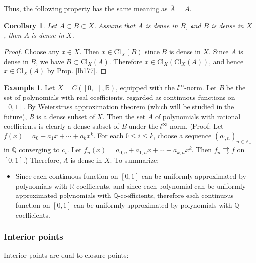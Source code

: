 \documentclass[12pt,b5paper,notitlepage]{article}
\theoremstyle{definition}
\newtheorem{eg}[df]{Example}
\theoremstyle{plain}
\newtheorem{co}[df]{Corollary}
\newcommand{\ovl}{\overline}
\newcommand{\Zbb}{\mathbb Z}
\newcommand{\Qbb}{\mathbb Q}
\newcommand{\Rbb}{\mathbb R}
\newcommand{\Cl}{\mathrm{Cl}}
\numberwithin{equation}{section}
\begin{document}
Thus, the following property has the same meaning as $\ovl{\ovl A}=A$.
\begin{co}
Let $A\subset B\subset X$. Assume that $A$ is dense in $B$, and $B$ is dense in $X$, then $A$ is dense in $X$.
\end{co}
\begin{proof}
Choose any $x\in X$. Then $x\in\Cl_X(B)$ since $B$ is dense in $X$. Since $A$ is dense in $B$, we have $B\subset \Cl_X(A)$. Therefore $x\in\Cl_X(\Cl_X(A))$, and hence $x\in\Cl_X(A)$ by Prop. \ref{lb177}.
\end{proof}

\begin{eg}
Let $X=C([0,1],\Rbb)$, equipped with the $l^\infty$-norm. Let $B$ be the set of polynomials with real coefficients, regarded as continuous functions on $[0,1]$. By Weierstrass approximation theorem (which will be studied in the future), $B$ is a dense subset of $X$. Then the set $A$ of polynomials with rational coefficients is clearly a dense subset of $B$ under the $l^\infty$-norm. (Proof: Let $f(x)=a_0+a_1x+\cdots+a_{k}x^k$. For each $0\leq i\leq k$, choose a sequence $(a_{i,n})_{n\in\Zbb_+}$ in $\Qbb$ converging to $a_i$. Let $f_n(x)=a_{0,n}+a_{1,n}x+\cdots+a_{k,n}x^k$. Then $f_n\rightrightarrows f$ on $[0,1]$.) Therefore, $A$ is dense in $X$. To summarize:
\begin{itemize}
\item Since each continuous function on $[0,1]$ can be uniformly approximated by polynomials with $\Rbb$-coefficients, and since each polynomial can be uniformly approximated polynomials with $\Qbb$-coefficients, therefore each continuous function on $[0,1]$ can be uniformly approximated by polynomials with $\Qbb$-coefficients.
\end{itemize}
\end{eg}





\subsubsection{Interior points}

Interior points are dual to closure points:
\end{document}
